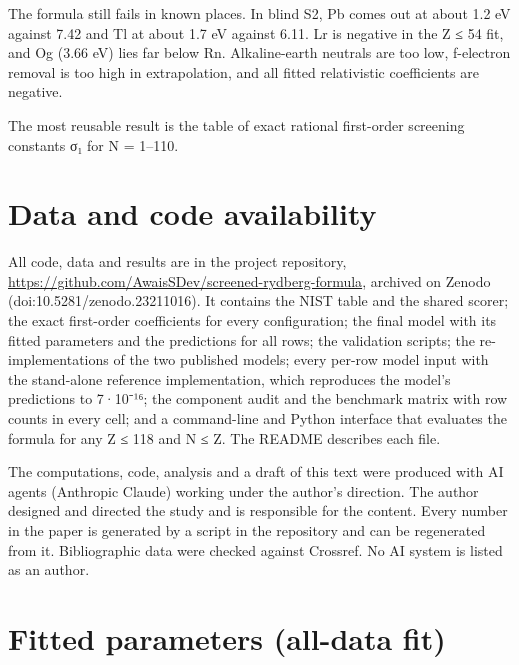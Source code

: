 \documentclass[aps,pra,preprint,notitlepage,superscriptaddress,amsmath,amssymb]{revtex4-2}
\begin{document}
The formula still fails in known places. In blind S2, Pb comes out at about 1.2 eV against 7.42 and Tl at about 1.7 eV against 6.11. Lr is negative in the Z ≤ 54 fit, and Og (3.66 eV) lies far below Rn. Alkaline-earth neutrals are too low, f-electron removal is too high in extrapolation, and all fitted relativistic coefficients are negative.


The most reusable result is the table of exact rational first-order screening constants σ₁ for N = 1–110.


\section*{Data and code availability}

All code, data and results are in the project repository, \url{https://github.com/AwaisSDev/screened-rydberg-formula}, archived on Zenodo (doi:10.5281/zenodo.23211016). It contains the NIST table and the shared scorer; the exact first-order coefficients for every configuration; the final model with its fitted parameters and the predictions for all rows; the validation scripts; the re-implementations of the two published models; every per-row model input with the stand-alone reference implementation, which reproduces the model's predictions to 7·10⁻¹⁶; the component audit and the benchmark matrix with row counts in every cell; and a command-line and Python interface that evaluates the formula for any Z ≤ 118 and N ≤ Z. The README describes each file.


\begin{acknowledgments}
The computations, code, analysis and a draft of this text were produced with AI agents (Anthropic Claude) working under the author's direction. The author designed and directed the study and is responsible for the content. Every number in the paper is generated by a script in the repository and can be regenerated from it. Bibliographic data were checked against Crossref. No AI system is listed as an author.
\end{acknowledgments}

\appendix
\section{Fitted parameters (all-data fit)}
\end{document}
